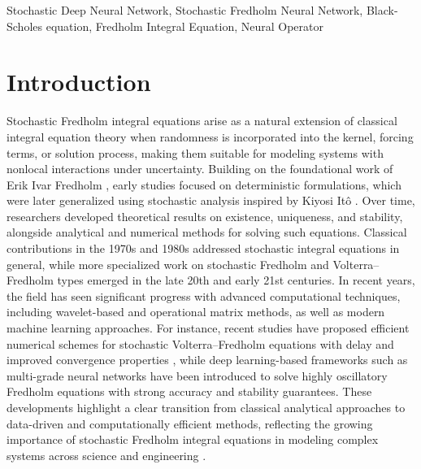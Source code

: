 \documentclass[preprint,12pt,authoryear]{elsarticle}
\begin{document}
\begin{frontmatter}


\begin{keyword}
Stochastic Deep Neural Network, Stochastic Fredholm Neural Network, Black-Scholes equation, Fredholm Integral Equation, Neural Operator
\end{keyword}

\end{frontmatter}














\section{Introduction}
Stochastic Fredholm integral equations arise as a natural extension of classical integral equation theory when randomness is incorporated into the kernel, forcing terms, or solution process, making them suitable for modeling systems with nonlocal interactions under uncertainty. Building on the foundational work of Erik Ivar Fredholm \cite{fredholm1903}, early studies focused on deterministic formulations, which were later generalized using stochastic analysis inspired by Kiyosi Itô \cite{ito1944}. Over time, researchers developed theoretical results on existence, uniqueness, and stability, alongside analytical and numerical methods for solving such equations. Classical contributions in the 1970s and 1980s addressed stochastic integral equations in general, while more specialized work on stochastic Fredholm and Volterra–Fredholm types emerged in the late 20th and early 21st centuries. In recent years, the field has seen significant progress with advanced computational techniques, including wavelet-based and operational matrix methods, as well as modern machine learning approaches. For instance, recent studies have proposed efficient numerical schemes for stochastic Volterra–Fredholm equations with delay and improved convergence properties \cite{yao2024} , while deep learning-based frameworks such as multi-grade neural networks have been introduced to solve highly oscillatory Fredholm equations with strong accuracy and stability guarantees. These developments highlight a clear transition from classical analytical approaches to data-driven and computationally efficient methods, reflecting the growing importance of stochastic Fredholm integral equations in modeling complex systems across science and engineering \cite{jiang2026}.
\end{document}
